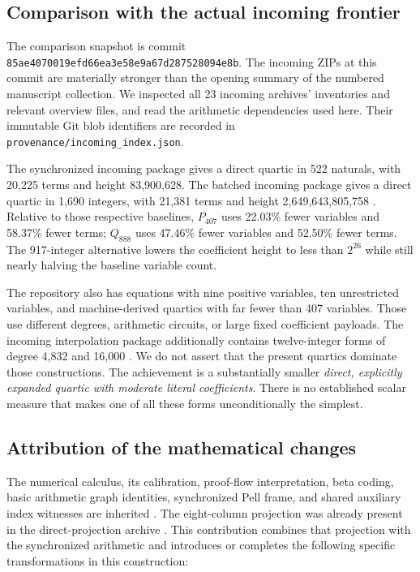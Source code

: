 \documentclass[10pt,letterpaper]{article}
\theoremstyle{definition}\newtheorem{definition}[theorem]{Definition}
\theoremstyle{remark}\newtheorem{remark}[theorem]{Remark}
\newcommand{\file}[1]{\texttt{\nolinkurl{#1}}}
\newcommand{\Pn}{P_{407}}\newcommand{\Pz}{Q_{888}}\newcommand{\Ps}{Q_{917}}
\begin{document}
\subsection{Comparison with the actual incoming frontier}

The comparison snapshot is commit
\file{85ae4070019efd66ea3e58e9a67d287528094e8b}. The incoming ZIPs at this
commit are materially stronger than the opening summary of the numbered
manuscript collection. We inspected all 23 incoming archives' inventories
and relevant overview files, and read the arithmetic dependencies used
here. Their immutable Git blob identifiers are recorded in
\file{provenance/incoming_index.json}.

The synchronized incoming package gives a direct quartic in 522 naturals,
with 20,225 terms and height 83,900,628. The batched incoming package gives
a direct quartic in 1,690 integers, with 21,381 terms and height
2,649,643,805,758 \cite{synchronized,batched}. Relative to those respective
baselines, $\Pn$ uses 22.03\% fewer variables and 58.37\% fewer terms;
$\Pz$ uses 47.46\% fewer variables and 52.50\% fewer terms.
The 917-integer alternative lowers the coefficient height to less than
$2^{26}$ while still nearly halving the baseline variable count.

The repository also has equations with nine positive variables, ten
unrestricted variables, and machine-derived quartics with far fewer than
407 variables. Those use different degrees, arithmetic circuits, or large
fixed coefficient payloads. The incoming interpolation package additionally
contains twelve-integer forms of degree 4,832 and 16,000
\cite{repo,interpolation}. We do not assert that the present quartics
dominate those constructions. The achievement is a substantially smaller
\emph{direct, explicitly expanded quartic with moderate literal coefficients}.
There is no established scalar measure that makes one of all these forms
unconditionally the simplest.

\subsection{Attribution of the mathematical changes}

The numerical calculus, its calibration, proof-flow interpretation, beta
coding, basic arithmetic graph identities, synchronized Pell frame, and
shared auxiliary index witnesses are inherited \cite{synchronized,calibration}.
The eight-column projection was already present in the direct-projection
archive \cite{projection}. This contribution combines that projection
with the synchronized arithmetic and introduces or completes the following
specific transformations in this construction:
\end{document}
